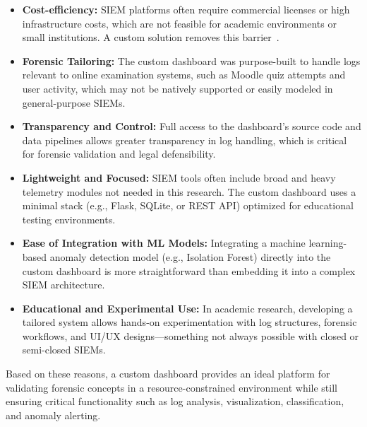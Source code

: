 \begin{itemize}
	\item \textbf{Cost-efficiency:} SIEM platforms often require commercial licenses or high infrastructure costs, which are not feasible for academic environments or small institutions. A custom solution removes this barrier~\cite{barker2018openlogtools}.
	
	\item \textbf{Forensic Tailoring:} The custom dashboard was purpose-built to handle logs relevant to online examination systems, such as Moodle quiz attempts and user activity, which may not be natively supported or easily modeled in general-purpose SIEMs.
	
	\item \textbf{Transparency and Control:} Full access to the dashboard's source code and data pipelines allows greater transparency in log handling, which is critical for forensic validation and legal defensibility.
	
	\item \textbf{Lightweight and Focused:} SIEM tools often include broad and heavy telemetry modules not needed in this research. The custom dashboard uses a minimal stack (e.g., Flask, SQLite, or REST API) optimized for educational testing environments.
	
	\item \textbf{Ease of Integration with ML Models:} Integrating a machine learning-based anomaly detection model (e.g., Isolation Forest) directly into the custom dashboard is more straightforward than embedding it into a complex SIEM architecture.
	
	\item \textbf{Educational and Experimental Use:} In academic research, developing a tailored system allows hands-on experimentation with log structures, forensic workflows, and UI/UX designs—something not always possible with closed or semi-closed SIEMs.
\end{itemize}

Based on these reasons, a custom dashboard provides an ideal platform for validating forensic concepts in a resource-constrained environment while still ensuring critical functionality such as log analysis, visualization, classification, and anomaly alerting.

